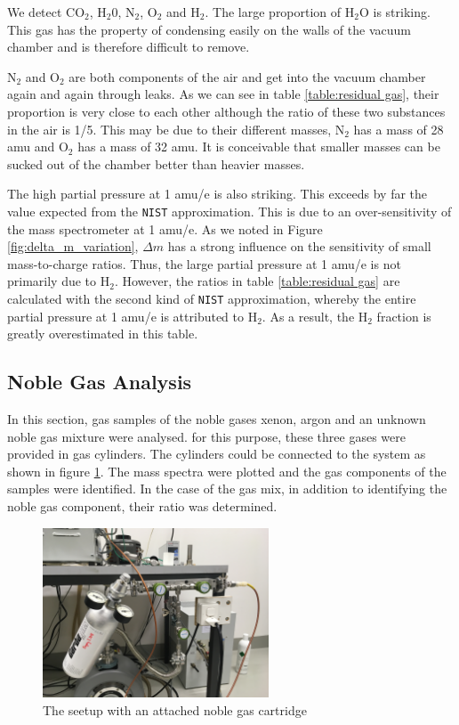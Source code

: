      We detect CO$_2$, H$_2$0, N$_2$, O$_2$ and H$_2$. The large proportion of H$_2$O is striking. This gas has the property of condensing easily on the walls of the vacuum chamber and is therefore difficult to remove.
     
     N$_2$ and O$_2$ are both components of the air and get into the vacuum chamber again and again through leaks. As we can see in table \ref{table:residual gas}, their proportion is very close to each other although the ratio of these two substances in the air is 1/5. This may be due to their different masses, N$_2$ has a mass of 28 amu and O$_2$ has a mass of 32 amu. It is conceivable that smaller masses can be sucked out of the chamber better than heavier masses.
     
    The high partial pressure at 1 amu/e is also striking. This exceeds by far the value expected from the \texttt{NIST} approximation. This is due to an over-sensitivity of the mass spectrometer at 1 amu/e. As we noted in Figure \ref{fig:delta_m_variation}, $\Delta m$ has a strong influence on the sensitivity of small mass-to-charge ratios. Thus, the large partial pressure at 1 amu/e is not primarily due to H$_2$. However, the ratios in table \ref{table:residual gas} are calculated with the second kind of \texttt{NIST} approximation, whereby the entire partial pressure at 1 amu/e is attributed to H$_2$. As a result, the H$_2$ fraction is greatly overestimated in this table.
    
    \subsection{Noble Gas Analysis}
    
    In this section, gas samples of the noble gases xenon, argon and an unknown noble gas mixture were analysed.
    for this purpose, these three gases were provided in gas cylinders. The cylinders could be connected to the system as shown in figure \ref{fig:cartridge}. 
    The mass spectra were plotted and the gas components of the samples were identified.  In the case of the gas mix, in addition to identifying the noble gas component, their ratio was determined.
    
    \begin{figure}[h!]
        \centering
        \includegraphics[width=0.6\textwidth]{Report/pictures/cartridge.JPG}
        \caption{The seetup with an attached noble gas cartridge}
        \label{fig:cartridge}
    \end{figure}

